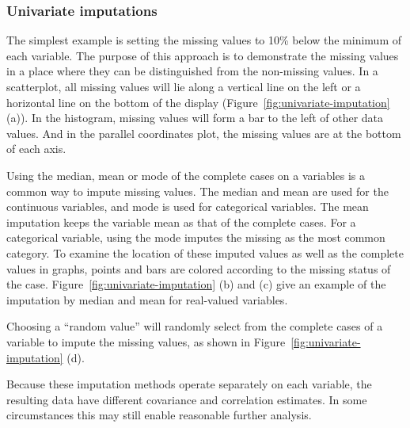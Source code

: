 \documentclass[article]{jss}
\begin{document}
\subsubsection{Univariate imputations}

The simplest example is setting the missing values to 10\% below the minimum of each variable. The purpose of this approach is to demonstrate the missing values in a place where they can be distinguished from the non-missing values. In a scatterplot, all missing values will lie along a vertical line on the left or a horizontal line on the bottom of the display (Figure~\ref{fig:univariate-imputation} (a)). In the histogram, missing values will form a bar to the left of other data values. And in the parallel coordinates plot, the missing values are at the bottom of each axis.

Using the median, mean or mode of the complete cases on a variables is a common way to impute missing values. The median and mean are used for the continuous variables, and mode is used for categorical variables. The mean imputation keeps the variable mean as that of the complete cases. For a categorical variable, using the mode imputes the missing as the most common category. To examine the location of these imputed values as well as the complete values in graphs, points and bars are colored according to the missing status of the case. Figure~\ref{fig:univariate-imputation} (b) and (c) give an example of the imputation by median and mean for real-valued variables.

Choosing a ``random value''  will randomly select from the complete cases of a variable to impute the missing values, as shown in Figure~\ref{fig:univariate-imputation} (d).

Because these imputation methods operate separately on each variable, the resulting data have different covariance and correlation estimates. In some circumstances this may still enable reasonable further analysis.
\end{document}
